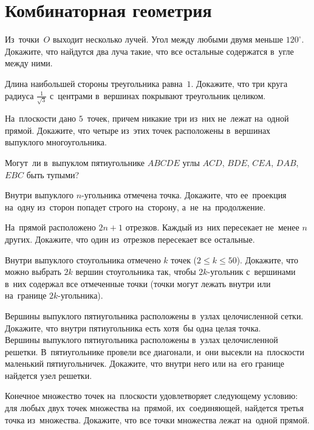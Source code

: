 
\section*{Комбинаторная геометрия}


\begin{problems}

\item
Из~точки~$O$ выходит несколько лучей.
Угол между любыми двумя меньше $120^{\circ}$.
Докажите, что найдутся два луча такие, что все остальные содержатся в~угле
между ними.

\item
Длина наибольшей стороны треугольника равна~$1$.
Докажите, что три круга радиуса $\frac{1}{\sqrt{3}}$ с~центрами в~вершинах
покрывают треугольник целиком.

\item
На~плоскости дано $5$~точек, причем никакие три из~них не~лежат на~одной
прямой.
Докажите, что четыре из~этих точек расположены в~вершинах выпуклого
многоугольника.

\item
Могут~ли в~выпуклом пятиугольнике $ABCDE$ углы $ACD$, $BDE$, $CEA$, $DAB$,
$EBC$ быть тупыми?

\item
Внутри выпуклого $n$-угольника отмечена точка.
Докажите, что ее~проекция на~одну из~сторон попадет строго на~сторону,
а~не~на~продолжение.


\item
На~прямой расположено $2 n + 1$ отрезков.
Каждый из~них пересекает не~менее $n$ других.
Докажите, что один из~отрезков пересекает все остальные.

\item
Внутри выпуклого стоугольника отмечено $k$ точек ($2 \leq k \leq 50$).
Докажите, что можно выбрать $2 k$ вершин стоугольника так, чтобы $2 k$-угольник
с~вершинами в~них содержал все отмеченные точки (точки могут лежать внутри или
на~границе $2 k$-угольника).

\item
\sp
Вершины выпуклого пятиугольника расположены в~узлах целочисленной сетки.
Докажите, что внутри пятиугольника есть хотя~бы одна целая точка.
\\
\sp
Вершины выпуклого пятиугольника расположены в~узлах целочисленной решетки.
В~пятиугольнике провели все диагонали, и~они высекли на~плоскости маленький
пятиугольничек.
Докажите, что внутри него или на~его границе найдется узел решетки.

\item
Конечное множество точек на~плоскости удовлетворяет следующему условию: для
любых двух точек множества на~прямой, их~соединяющей, найдется третья точка
из~множества.
Докажите, что все точки множества лежат на~одной прямой.

\end{problems}

